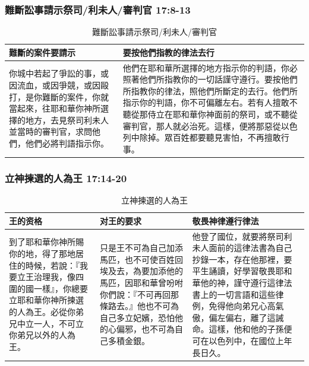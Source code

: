 \subsubsection{難斷訟事請示祭司/利未人/審判官 17:8-13}
\begin{table}[H]
\begin{center}
\begin{tabular}{ p{6cm}|p{11cm} } \toprule
難斷的案件要請示&要按他們指教的律法去行\\\hline
你城中若起了爭訟的事，或因流血，或因爭競，或因毆打，是你難斷的案件，你就當起來，往耶和華你神所選擇的地方，去見祭司利未人並當時的審判官，求問他們，他們必將判語指示你。&他們在耶和華所選擇的地方指示你的判語，你必照著他們所指教你的一切話謹守遵行。要按他們所指教你的律法，照他們所斷定的去行。他們所指示你的判語，你不可偏離左右。若有人擅敢不聽從那侍立在耶和華你神面前的祭司，或不聽從審判官，那人就必治死。這樣，便將那惡從以色列中除掉。眾百姓都要聽見害怕，不再擅敢行事。 \\\hline
\end{tabular}
\end{center}
\caption{難斷訟事請示祭司/利未人/審判官}
\end{table}



\subsubsection{立神揀選的人為王 17:14-20 }
\begin{table}[H]
\begin{center}
\begin{tabular}{ p{5cm}|p{5cm}|p{7cm} } \toprule
王的资格&对王的要求&敬畏神律遵行律法\\\hline
到了耶和華你神所賜你的地，得了那地居住的時候，若說：『我要立王治理我，像四圍的國一樣』，你總要立耶和華你神所揀選的人為王。必從你弟兄中立一人，不可立你弟兄以外的人為王。&只是王不可為自己加添馬匹，也不可使百姓回埃及去，為要加添他的馬匹，因耶和華曾吩咐你們說：『不可再回那條路去。』他也不可為自己多立妃嬪，恐怕他的心偏邪，也不可為自己多積金銀。&他登了國位，就要將祭司利未人面前的這律法書為自己抄錄一本，存在他那裡，要平生誦讀，好學習敬畏耶和華他的神，謹守遵行這律法書上的一切言語和這些律例，免得他向弟兄心高氣傲，偏左偏右，離了這誡命。這樣，他和他的子孫便可在以色列中，在國位上年長日久。  \\\hline
\end{tabular}
\end{center}
\caption{立神揀選的人為王}
\end{table}


